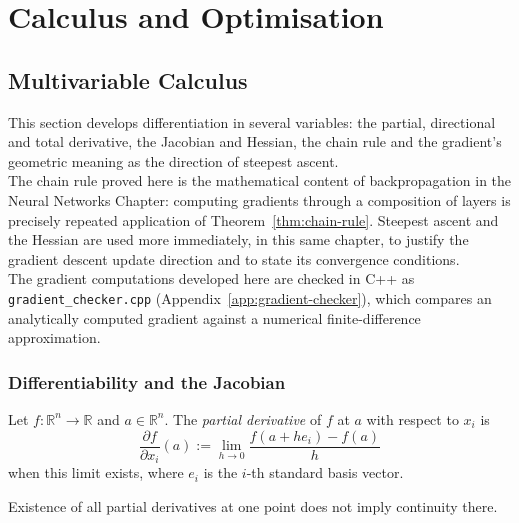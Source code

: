 \chapter{Calculus and Optimisation}
\label{chap:calculus}

\section{Multivariable Calculus}
\label{sec:multivariable-calculus}
	
	This section develops differentiation in several variables: the partial, directional and total derivative, the Jacobian and Hessian, the chain rule and the gradient's geometric meaning as the direction of steepest ascent. \\
	
	The chain rule proved here is the mathematical content of backpropagation in the Neural Networks Chapter: computing gradients through a composition of layers is precisely repeated application of Theorem~\ref{thm:chain-rule}. Steepest ascent and the Hessian are used more immediately, in this same chapter, to justify the gradient descent update direction and to state its convergence conditions. \\
	
	The gradient computations developed here are checked in C++ as \texttt{gradient\_checker.cpp} (Appendix~\ref{app:gradient-checker}), which compares an analytically computed gradient against a numerical finite-difference approximation.
	
	\subsection{Differentiability and the Jacobian}
	\label{subsec:differentiability-and-jacobian}
		
		\begin{definition}
			\label{def:partial-derivative}
			Let $f:\mathbb{R}^n\to\mathbb{R}$ and $a\in\mathbb{R}^n$. The \emph{partial derivative} of $f$ at $a$ with respect to $x_i$ is
			\[
				\frac{\partial f}{\partial x_i}(a) := \lim_{h\to0} \frac{f(a+he_i)-f(a)}{h}
			\]
			when this limit exists, where $e_i$ is the $i$-th standard basis vector.
		\end{definition}
		
		\begin{remark}
			\label{rem:partials-are-weak}
			Existence of all partial derivatives at one point does not imply continuity there.
		\end{remark}
		
